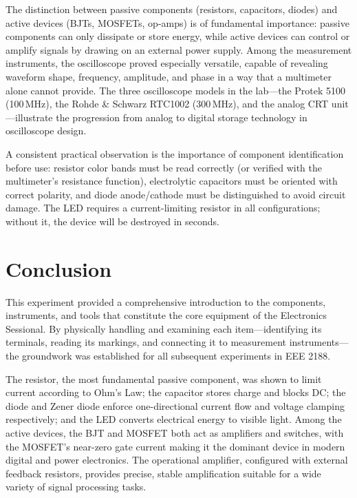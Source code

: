 \documentclass[12pt, a4paper, twoside]{report}
\begin{document}
The distinction between passive components (resistors, capacitors, diodes) and active
devices (BJTs, MOSFETs, op-amps) is of fundamental importance: passive components
can only dissipate or store energy, while active devices can control or amplify signals
by drawing on an external power supply. Among the measurement instruments, the
oscilloscope proved especially versatile, capable of revealing waveform shape, frequency,
amplitude, and phase in a way that a multimeter alone cannot provide. The three
oscilloscope models in the lab---the Protek 5100 (100\,MHz), the Rohde \& Schwarz RTC1002
(300\,MHz), and the analog CRT unit---illustrate the progression from analog to digital
storage technology in oscilloscope design.

A consistent practical observation is the importance of component identification before
use: resistor color bands must be read correctly (or verified with the multimeter's
resistance function), electrolytic capacitors must be oriented with correct polarity,
and diode anode/cathode must be distinguished to avoid circuit damage. The LED requires
a current-limiting resistor in all configurations; without it, the device will be
destroyed in seconds.


\vspace{2cm}

\section{Conclusion}

This experiment provided a comprehensive introduction to the components, instruments,
and tools that constitute the core equipment of the Electronics Sessional. By physically
handling and examining each item---identifying its terminals, reading its markings, and
connecting it to measurement instruments---the groundwork was established for all
subsequent experiments in EEE 2188.

The resistor, the most fundamental passive component, was shown to limit current
according to Ohm's Law; the capacitor stores charge and blocks DC; the diode and Zener
diode enforce one-directional current flow and voltage clamping respectively; and the
LED converts electrical energy to visible light. Among the active devices, the BJT and
MOSFET both act as amplifiers and switches, with the MOSFET's near-zero gate current
making it the dominant device in modern digital and power electronics. The operational
amplifier, configured with external feedback resistors, provides precise, stable
amplification suitable for a wide variety of signal processing tasks.
\end{document}
